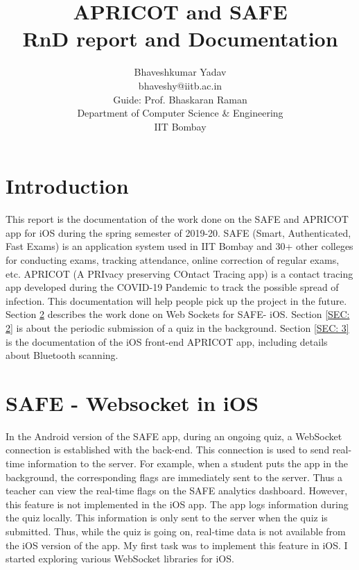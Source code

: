 \documentclass[12pt, conference, a4paper]{article}
\begin{document}
\title{\Huge APRICOT and SAFE \\ \large RnD report and Documentation
}
\author{
  \small
\begin{tabular}{c}  {Bhaveshkumar Yadav} \\ bhaveshy@iitb.ac.in \\ Guide: Prof. Bhaskaran Raman \\ \footnotesize Department of Computer Science \& Engineering \\ IIT Bombay \end{tabular} }

\maketitle
{}



\section{Introduction}
\label{SEC:introduction}
This report is the documentation of the work done on the SAFE and APRICOT app for iOS during the spring semester of 2019-20. SAFE (Smart, Authenticated, Fast Exams) is an application system used in IIT Bombay and 30+ other colleges for conducting exams, tracking attendance, online correction of regular exams, etc. 
APRICOT (A PRIvacy preserving COntact Tracing app) is a contact tracing app developed during the COVID-19 Pandemic to track the possible spread of infection. This documentation will help people pick up the project in the future. 
Section \ref{SEC: 1} describes the work done on Web Sockets for SAFE- iOS. Section \ref{SEC: 2} is about the periodic submission of a quiz in the background. Section \ref{SEC: 3} is the documentation of the iOS front-end APRICOT app, including details about Bluetooth scanning.

\section{SAFE - Websocket in iOS}
\label{SEC: 1}
In the Android version of the SAFE app, during an ongoing quiz, a WebSocket connection is established with the back-end. This connection is used to send real-time information to the server. For example, when a student puts the app in the background, the corresponding flags are immediately sent to the server.
Thus a teacher can view the real-time flags on the SAFE analytics dashboard. 
However, this feature is not implemented in the iOS app. The app logs information during the quiz locally. This information is only sent to the server when the quiz is submitted. Thus, while the quiz is going on, real-time data is not available from the iOS version of the app. 
My first task was to implement this feature in iOS. I started exploring various WebSocket libraries for iOS. 
\end{document}
